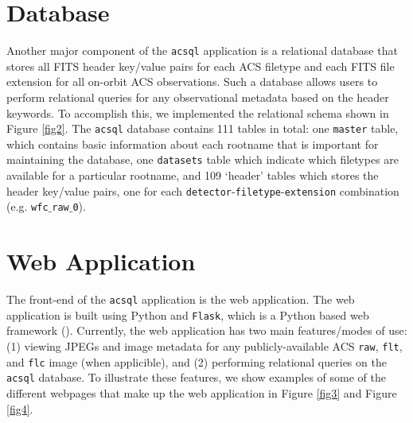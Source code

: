 \documentclass[11pt,twoside]{article}
\begin{document}


\section{Database}

Another major component of the \texttt{acsql} application is a relational database that stores all FITS header key/value pairs for
each ACS filetype and each FITS file extension for all on-orbit ACS observations.  Such a database allows users to perform relational queries for
any observational metadata based on the header keywords.  To accomplish this, we implemented the relational schema shown in Figure \ref{fig2}.
The \texttt{acsql} database contains 111 tables in total: one \texttt{master} table, which contains basic information about each rootname that is
important for maintaining the database, one \texttt{datasets} table which indicate which filetypes are available for a particular rootname, and 109
`header' tables which stores the header key/value pairs, one for each \texttt{detector}-\texttt{filetype}-\texttt{extension} combination
(e.g. \texttt{wfc$\_$raw$\_$0}).



\section{Web Application}

The front-end of the \texttt{acsql} application is the web application.  The web application is built using Python and \texttt{Flask}, which is a
Python based web framework (\citet{Ronacher}).  Currently, the web application has two main features/modes of use: (1) viewing JPEGs and image
metadata for any publicly-available ACS \texttt{raw}, \texttt{flt}, and \texttt{flc} image (when applicible), and (2) performing relational queries
on the \texttt{acsql} database.  To illustrate these features, we show examples of some of the different webpages that make up the web application
in Figure \ref{fig3} and Figure \ref{fig4}.
\end{document}
